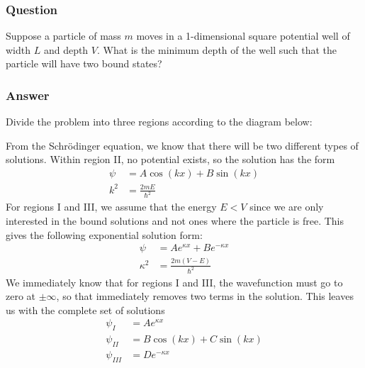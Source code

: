 \subsubsection{Question}

Suppose a particle of mass $m$ moves in a 1-dimensional square potential
well of width $L$ and depth $V$. What is the minimum depth of the well such
that the particle will have two bound states?

\subsubsection{Answer}

Divide the problem into three regions according to the diagram below:
\begin{figure}[H]
    \centering
\end{figure}

From the Schrödinger equation, we know that there will be two different types
of solutions. Within region II, no potential exists, so the solution has
the form
\begin{align*}
    \psi  &= A\cos (kx) + B\sin (kx) \\
    k^2 &= \frac{2mE}{{\hbar}^2}
\end{align*}
For regions I and III, we assume that the energy $E < V$ since we are only
interested in the bound solutions and not ones where the particle is free.
This gives the following exponential solution form:
\begin{align*}
    \psi  &= Ae^{\kappa x} + Be^{-\kappa x} \\
    \kappa^2 &= \frac{2m(V-E)}{{\hbar}^2}
\end{align*}
We immediately know that for regions I and III, the wavefunction must go to
zero at $\pm\infty $, so that immediately removes two terms in the solution. This
leaves us with the complete set of solutions
\begin{align*}
    \psi_{I}   &= Ae^{\kappa x} \\
    \psi_{II}  &= B\cos(kx) + C\sin(kx) \\
    \psi_{III} &= De^{-\kappa x}
\end{align*}

